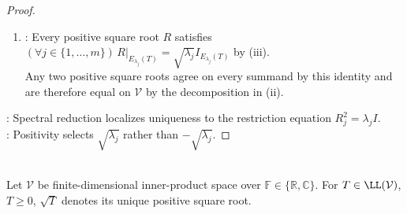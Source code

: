 \begin{proposition}
\begin{proof}
\begin{enumerate}[label=(\roman*)]
Every corresponding eigenvalue $\rho$ satisfies $\rho\geq0$ by Theorem \ref{thm:positive-operator-characterization}(i),(ii) and $\rho^2=\lambda_j$ by the restriction identity.\\
Therefore $\rho=\sqrt{\lambda_j}$, so $R_j=\sqrt{\lambda_j}I_{E_{\lambda_j}(T)}$ by Proposition \ref{prop:linear-map-determined-by-basis}.
\item {}: Every positive square root $R$ satisfies $(\forall j\in\{1,\ldots,m\})\,R|_{E_{\lambda_j}(T)}=\sqrt{\lambda_j}I_{E_{\lambda_j}(T)}$ by (iii).\\
Any two positive square roots agree on every summand by this identity and are therefore equal on $\mathcal{V}$ by the decomposition in (ii).
\end{enumerate}
: Spectral reduction localizes uniqueness to the restriction equation $R_j^2=\lambda_jI$.\\
: Positivity selects $\sqrt{\lambda_j}$ rather than $-\sqrt{\lambda_j}$.
\end{proof}
\end{proposition}

\begin{definition} \label{def:positive-square-root-notation} \\
Let $\mathcal{V}$ be finite-dimensional inner-product space over $\mathbb{F}\in\{\mathbb{R},\mathbb{C}\}$. For $T\in\LL(\mathcal{V})$, $T\geq0$, $\sqrt{T}$ denotes its unique positive square root.
\end{definition}

